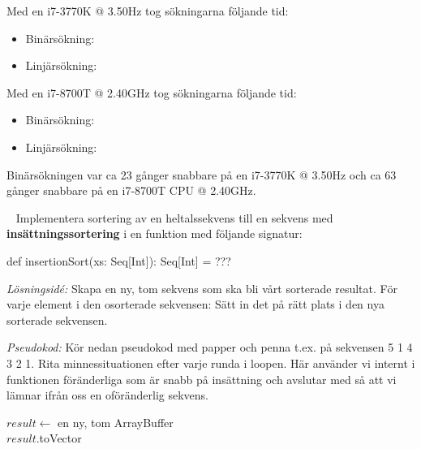 \SubtaskSolved
Med en i7-3770K @ 3.50Hz tog sökningarna följande tid:

\begin{itemize}
\item Binärsökning: 
\item Linjärsökning: 
\end{itemize}

Med en i7-8700T @ 2.40GHz tog sökningarna följande tid:
\begin{itemize}
\item Binärsökning: 
\item Linjärsökning: 
\end{itemize}




\SubtaskSolved
Binärsökningen var ca 23 gånger snabbare på en i7-3770K @ 3.50Hz och ca 63 gånger snabbare på en i7-8700T CPU @ 2.40GHz.



\QUESTEND






\QUESTBEGIN

\Task  \what~ Implementera sortering av en heltalssekvens till en  sekvens med \textbf{insättningssortering}  i en funktion med följande signatur:
\begin{Code}
def insertionSort(xs: Seq[Int]): Seq[Int] = ???
\end{Code}

\emph{Lösningsidé:} Skapa en ny, tom sekvens som ska bli vårt sorterade resultat. För varje element i den osorterade sekvensen: Sätt in det på rätt plats i den nya sorterade sekvensen.

\Subtask \emph{Pseudokod:} Kör nedan pseudokod med papper och penna t.ex. på sekvensen 5 1 4 3 2 1. Rita minnessituationen efter varje runda i loopen. Här använder vi internt i funktionen föränderliga  som är snabb på insättning och avslutar med  så att vi lämnar ifrån oss en oföränderlig sekvens.

\begin{algorithm}[H]
    $result \leftarrow$ en ny, tom ArrayBuffer \\
    $result$.toVector
\end{algorithm}


